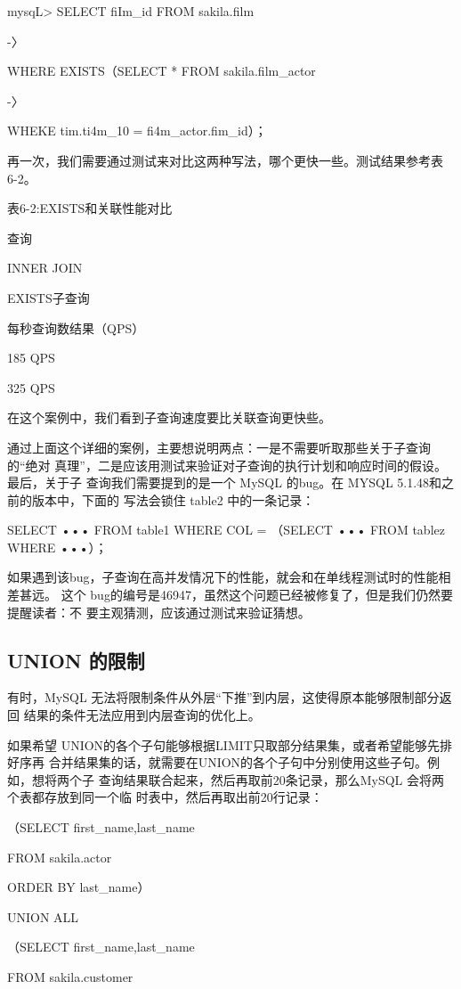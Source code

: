 mysqL> SELECT fiIm\_id FROM sakila.film

-〉

WHERE EXISTS（SELECT * FROM sakila.film\_actor

-〉

WHEKE tim.ti4m\_10 = fi4m\_actor.fim\_id）；

再一次，我们需要通过测试来对比这两种写法，哪个更快一些。测试结果参考表 6-2。

表6-2:EXISTS和关联性能对比

查询

INNER JOIN

EXISTS子查询

每秒查询数结果（QPS）

185 QPS

325 QPS

在这个案例中，我们看到子查询速度要比关联查询更快些。

通过上面这个详细的案例，主要想说明两点：一是不需要听取那些关于子查询的“绝对
真理”，二是应该用测试来验证对子查询的执行计划和响应时间的假设。最后，关于子
查询我们需要提到的是一个 MySQL 的bug。在 MYSQL 5.1.48和之前的版本中，下面的
写法会锁住 table2 中的一条记录：

SELECT ••• FROM table1 WHERE COL = （SELECT ••• FROM tablez WHERE •••）；

如果遇到该bug，子查询在高并发情况下的性能，就会和在单线程测试时的性能相差甚远。
这个 bug的编号是46947，虽然这个问题已经被修复了，但是我们仍然要提醒读者：不
要主观猜测，应该通过测试来验证猜想。

\subsection{UNION 的限制}
有时，MySQL 无法将限制条件从外层“下推”到内层，这使得原本能够限制部分返回
结果的条件无法应用到内层查询的优化上。

如果希望 UNION的各个子句能够根据LIMIT只取部分结果集，或者希望能够先排好序再
合并结果集的话，就需要在UNION的各个子句中分别使用这些子句。例如，想将两个子
查询结果联合起来，然后再取前20条记录，那么MySQL 会将两个表都存放到同一个临
时表中，然后再取出前20行记录：

（SELECT first\_name,last\_name

FROM sakila.actor

ORDER BY last\_name）

UNION ALL

（SELECT first\_name,last\_name

FROM sakila.customer


